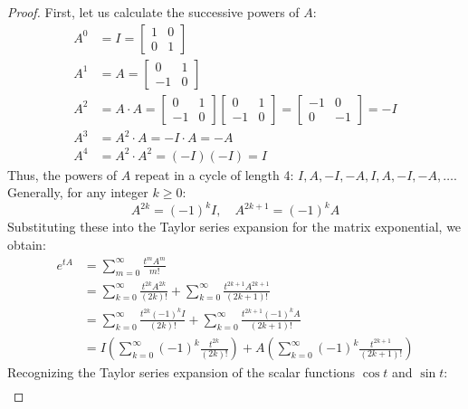\documentclass[12pt,a4paper]{report}
\theoremstyle{definition}
\numberwithin{equation}{chapter}
\begin{document}
\begin{proof}
First, let us calculate the successive powers of $A$:
\begin{align*}
A^0 &= I = \begin{bmatrix} 1 & 0 \\ 0 & 1 \end{bmatrix} \\
A^1 &= A = \begin{bmatrix} 0 & 1 \\ -1 & 0 \end{bmatrix} \\
A^2 &= A \cdot A = \begin{bmatrix} 0 & 1 \\ -1 & 0 \end{bmatrix} \begin{bmatrix} 0 & 1 \\ -1 & 0 \end{bmatrix} = \begin{bmatrix} -1 & 0 \\ 0 & -1 \end{bmatrix} = -I \\
A^3 &= A^2 \cdot A = -I \cdot A = -A \\
A^4 &= A^2 \cdot A^2 = (-I)(-I) = I
\end{align*}
Thus, the powers of $A$ repeat in a cycle of length 4: $I, A, -I, -A, I, A, -I, -A, \ldots$. Generally, for any integer $k \ge 0$:
\begin{equation}
A^{2k} = (-1)^k I, \quad A^{2k+1} = (-1)^k A
\end{equation}
Substituting these into the Taylor series expansion for the matrix exponential, we obtain:
\begin{equation}
\begin{aligned}
e^{tA} &= \sum_{m=0}^\infty \frac{t^m A^m}{m!} \\
      &= \sum_{k=0}^\infty \frac{t^{2k} A^{2k}}{(2k)!} + \sum_{k=0}^\infty \frac{t^{2k+1} A^{2k+1}}{(2k+1)!} \\
      &= \sum_{k=0}^\infty \frac{t^{2k} (-1)^k I}{(2k)!} + \sum_{k=0}^\infty \frac{t^{2k+1} (-1)^k A}{(2k+1)!} \\
      &= I \left( \sum_{k=0}^\infty (-1)^k \frac{t^{2k}}{(2k)!} \right) + A \left( \sum_{k=0}^\infty (-1)^k \frac{t^{2k+1}}{(2k+1)!} \right)
\end{aligned}
\end{equation}
Recognizing the Taylor series expansion of the scalar functions $\cos t$ and $\sin t$:
\begin{align}

\end{align}
\end{proof}
\end{document}
